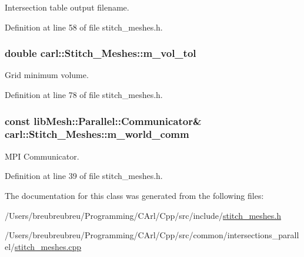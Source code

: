 Intersection table output filename. 



Definition at line 58 of file stitch\+\_\+meshes.\+h.

\hypertarget{classcarl_1_1_stitch___meshes_a6c5e1728cc1118b1052f78f87c560c91}{}
\subsubsection[{m\+\_\+vol\+\_\+tol}]{\setlength{\rightskip}{0pt plus 5cm}double carl\+::\+Stitch\+\_\+\+Meshes\+::m\+\_\+vol\+\_\+tol\hspace{0.3cm}{\ttfamily [protected]}}\label{classcarl_1_1_stitch___meshes_a6c5e1728cc1118b1052f78f87c560c91}


Grid minimum volume. 



Definition at line 78 of file stitch\+\_\+meshes.\+h.

\hypertarget{classcarl_1_1_stitch___meshes_a7a19535c9488135f3fb68f18a04a9442}{}
\subsubsection[{m\+\_\+world\+\_\+comm}]{\setlength{\rightskip}{0pt plus 5cm}const lib\+Mesh\+::\+Parallel\+::\+Communicator\& carl\+::\+Stitch\+\_\+\+Meshes\+::m\+\_\+world\+\_\+comm\hspace{0.3cm}{\ttfamily [protected]}}\label{classcarl_1_1_stitch___meshes_a7a19535c9488135f3fb68f18a04a9442}


M\+P\+I Communicator. 



Definition at line 39 of file stitch\+\_\+meshes.\+h.



The documentation for this class was generated from the following files\+:\begin{DoxyCompactItemize}
\item 
/\+Users/breubreubreu/\+Programming/\+C\+Arl/\+Cpp/src/include/\hyperlink{stitch__meshes_8h}{stitch\+\_\+meshes.\+h}\item 
/\+Users/breubreubreu/\+Programming/\+C\+Arl/\+Cpp/src/common/intersections\+\_\+parallel/\hyperlink{stitch__meshes_8cpp}{stitch\+\_\+meshes.\+cpp}\end{DoxyCompactItemize}
